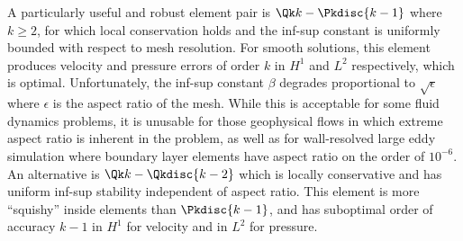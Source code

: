 A particularly useful and robust element pair is $\Qk k-\Pkdisc{k-1}$ where $k \ge 2$, for which local conservation holds and the inf-sup constant is uniformly bounded with respect to mesh resolution.
For smooth solutions, this element produces velocity and pressure errors of order $k$ in $H^1$ and $L^2$ respectively, which is optimal.
Unfortunately, the inf-sup constant $\beta$ degrades proportional to $\sqrt{\epsilon}$ where $\epsilon$ is the aspect ratio of the mesh.
While this is acceptable for some fluid dynamics problems, it is unusable for those geophysical flows in which extreme aspect ratio is inherent in the problem, as well as for wall-resolved large eddy simulation where boundary layer elements have aspect ratio on the order of $10^{-6}$.
An alternative is $\Qk k - \Qkdisc{k-2}$ which is locally conservative and has uniform inf-sup stability independent of aspect ratio.
This element is more ``squishy'' inside elements than $\Pkdisc{k-1}$, and has suboptimal order of accuracy $k-1$ in $H^1$ for velocity and in $L^2$ for pressure.
